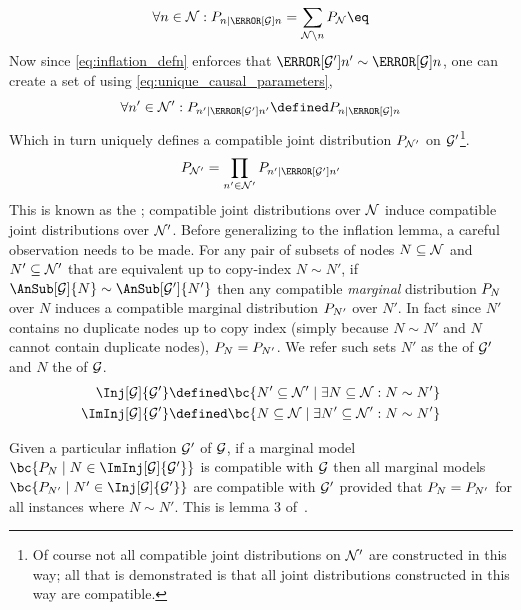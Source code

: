 \documentclass[aps, 10pt, english, twoside, pra, nofootinbib, longbibliography]{revtex4-1}
\begin{document}
    \[ \forall n \in \nodes : \prob[n\mid \Pa[\graph]{n}] = \sum_{\nodes \setminus n} \prob[\nodes] \eq \label{eq:unique_causal_parameters}\]
    Now since \cref{eq:inflation_defn} enforces that $\Pa[\graph']{n'} \sim \Pa[\graph]{n}$, one can create a set of  using \cref{eq:unique_causal_parameters},
    \[ \forall n' \in \nodes' : \prob[n'\mid \Pa[\graph']{n'}] \defined \prob[n\mid \Pa[\graph]{n}] \]
    Which in turn uniquely defines a compatible joint distribution $\prob[\nodes']$ on $\mathcal{G}'$\footnote{Of course not all compatible joint distributions on $\mathcal{N}'$ are constructed in this way; all that is demonstrated is that all joint distributions constructed in this way are compatible.}.
    \[ \prob[\nodes'] = \prod_{n' \in \nodes'} \prob[n'\mid \Pa[\graph']{n'}] \]
    This is known as the ; compatible joint distributions over $\mathcal{N}$ induce compatible joint distributions over $\mathcal{N}'$. Before generalizing to the inflation lemma, a careful observation needs to be made. For any pair of subsets of nodes $N \subseteq \mathcal{N}$ and $N' \subseteq \mathcal{N}'$ that are equivalent up to copy-index $N \sim N'$, if $\AnSub[\graph]{N} \sim \AnSub[\graph']{N'}$ then any compatible \textit{marginal} distribution $\prob[N]$ over $N$ induces a compatible marginal distribution $\prob[N']$ over $N'$. In fact since $N'$ contains no duplicate nodes up to copy index (simply because $N \sim N'$ and $N$ cannot contain duplicate nodes), $\prob[N] = \prob[N']$. We refer such sets $N'$ as the  of $\mathcal{G}'$ and $N$ the  of $\mathcal{G}$.
    \begin{align*}
        \Inj[\graph]{\graph'} &\defined \bc{N' \subseteq \nodes' \mid \exists N \subseteq \nodes : N \sim N'} \\
        \ImInj[\graph]{\graph'} &\defined \bc{N \subseteq \nodes \mid \exists N' \subseteq \nodes' : N \sim N'}
    \end{align*}

    \begin{lemma}
        \label{lem:inflation}
         Given a particular inflation $\mathcal{G}'$ of $\mathcal{G}$, if a marginal model $\bc{\prob[N] \mid N \in \ImInj[\graph]{\graph'}}$ is compatible with $\mathcal{G}$ then all marginal models $\bc{\prob[N'] \mid N' \in \Inj[\graph]{\graph'}}$ are compatible with $\mathcal{G}'$ provided that $\prob[N] = \prob[N']$ for all instances where $N \sim N'$.
        This is lemma 3 of~\cite{Inflation}.
    \end{lemma}
\end{document}
